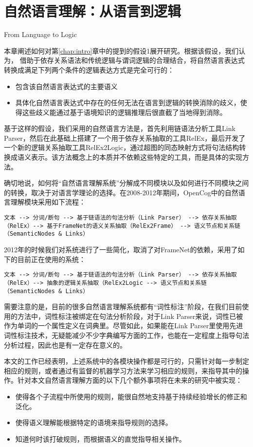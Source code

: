 \chapter{自然语言理解：从语言到逻辑}{From Language to Logic}
\label{chap:comprehension}

本章阐述如何对第\ref{chap:intro}章中的提到的假设1展开研究。根据该假设，我们认为， 借助于依存关系语法和传统逻辑与谓词逻辑的合理结合，将自然语言表达式转换成满足下列两个条件的逻辑表达方式是完全可行的：
\begin{itemize}
\item 包含该自然语言表达式的主要语义
\item 具体化自然语言表达式中存在的任何无法在语言到逻辑的转换消除的歧义，使得这些歧义能通过基于语境知识的逻辑推理后很直截了当地得到消除。
\end{itemize}

基于这样的假设，我们采用的自然语言方法是，首先利用链语法分析工具Link Parser\cite{Sleator1993}，然后在此基础上搭建了一个用于依存关系抽取的工具RelEx，最后开发了一个新的逻辑关系抽取工具RelEx2Logic，通过超图的同态映射方式将句法结构转换成语义表示。该方法概念上的本质并不依赖这些特定的工具，而是具体的实现方法。

确切地说，如何将“自然语言理解系统”分解成不同模块以及如何进行不同模块之间的转换，取决于对语言学理论的选择。在2008-2012年期间，OpenCog中的自然语言理解模块采用如下流程：

\begin{verbatim}
文本 --> 分词/断句 --> 基于链语法的句法分析（Link Parser） --> 依存关系抽取（RelEx）--> 基于FrameNet的语义关系抽取（RelEx2Frame） --> 语义节点和关系链（SemanticNodes & Links）
\end{verbatim}

2012年的时候我们对系统进行了一些简化，取消了对FrameNet的依赖，采用了如下的目前正在使用的系统：

\begin{verbatim}
文本 --> 分词/断句 --> 基于链语法的句法分析（Link Parser） --> 依存关系抽取（RelEx）--> 抽象的逻辑关系抽取（RelEx2Logic --> 语义节点和关系链（SemanticNodes & Links）
\end{verbatim}

需要注意的是，目前的很多自然语言理解系统都有“词性标注”阶段，在我们目前使用的方法中，词性标注被绑定在句法分析阶段，对于Link Parser来说，词性已被作为单词的一个属性定义在词典里。尽管如此，如果能在Link Parser里使用先进词性标注技术，无疑能减少不少字典编写方面的工作，也能在一定程度上指导句法分析过程，因此也是有一定存在意义的。

本文的工作已经表明，上述系统中的各模块操作都是可行的，只需针对每一步制定相应的规则，或者通过有监督的机器学习方法来学习相应的规则，来指导其中的操作。针对本文自然语言理解方面的以下几个额外事项将在未来的研究中被实现：
\begin{itemize}
\item 使得各个子流程中所使用的规则，能很自然地支持基于持续经验增长的修正和泛化。
\item 使得语义理解能根据特定的语境来指导规则的选择。
\item 知道何时该打破规则，而根据语义的直觉指导相关操作。
\end{itemize}

